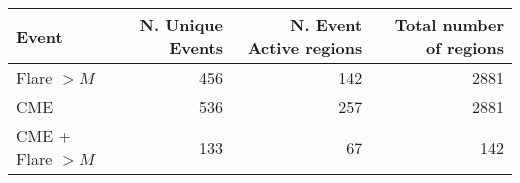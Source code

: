 \begin{tabular}{lrrr}
\toprule
Event & N. Unique Events & N. Event Active regions & Total number of regions \\
\midrule
Flare $>M$ & 456 & 142 & 2881 \\
CME & 536 & 257 & 2881 \\
CME + Flare $>M$ & 133 & 67 & 142 \\
\bottomrule
\end{tabular}
